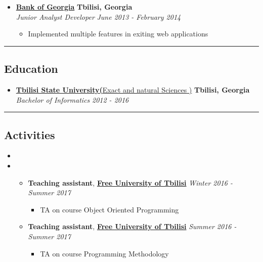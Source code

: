 \documentclass[10pt,letterpaper]{article}
\begin{document}
\begin{itemize}
\begin{itemize}[label=\textbullet]
    \end{itemize}
    \hfill \break
    
     \item[]
    {\href{http://bankofgeorgia.ge/en/}{\textbf{Bank of Georgia}} \hfill
      \textbf{Tbilisi, Georgia}}
    \\
    {\emph{Junior Analyst Developer} \hfill \emph{June 2013 - February 2014}}

    \begin{itemize}[label=\textbullet]
      \itemsep0em
      \item Implemented multiple features in exiting web applications
    \end{itemize}
    
    \end{itemize}

\hrule
\vspace{-1.0em}
\subsection*{Education}
  \begin{itemize}
    \parskip=-0.5em

    \item[]
    {\href{https://www.tsu.ge/en/}{\textbf{Tbilisi State University\normalfont (}Exact and natural Sciences{\normalfont
)}} \hfill
      \textbf{Tbilisi, Georgia}}
    \\
    {\emph{Bachelor of Informatics} \hfill
      \emph{2012 - 2016}}

  \end{itemize}


\hrule
\vspace{-1.0em}
\subsection*{Activities}
  \begin{itemize}
    \parskip=-0.5em

\item[]

    \item[]
    \begin{itemize}
        \item{\textbf{Teaching assistant}, \textbf{\href{https://www.freeuni.edu.ge/en}{Free University of Tbilisi}}
        \hfill\emph{Winter 2016 - Summer 2017}
        \begin{itemize}
            \item TA on course Object Oriented Programming
        \end{itemize} }

        \item{\textbf{Teaching assistant}, \textbf{\href{https://www.freeuni.edu.ge/en}{Free University of Tbilisi}}
        \hfill\emph{Summer 2016 - Summer 2017}
        \begin{itemize}
            \item TA on course Programming Methodology
        \end{itemize}}
    \end{itemize}

  \end{itemize}
\end{document}
